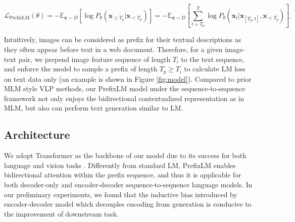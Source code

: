 \begin{equation}
\label{eq:prefix}
    \mathcal{L}_\text{PrefixLM}(\theta) = - \mathbb{E}_{\textbf{x} \sim D} \left[ \log P_{\theta}(\textbf{x}_{\geq T_p} | \textbf{x}_{<T_p}) \right] = - \mathbb{E}_{\textbf{x} \sim D} \left[ \sum_{t=T_p}^{T}  \log P_{\theta}(\textbf{x}_t|\textbf{x}_{[T_p, t]}, \textbf{x}_{<T_p}) \right].
\end{equation}

Intuitively, images can be considered as prefix for their textual descriptions as they often appear before text in a web document. Therefore, for a given image-text pair, we prepend image feature sequence of length $T_i$ to the text sequence, and enforce the model to sample a prefix of length $T_p \geq T_i$ to calculate LM loss on text data only (an example is shown in Figure \ref{fig:model}).
Compared to prior MLM style VLP methods, our PrefixLM model under the sequence-to-sequence framework not only enjoys the bidirectional contextualized representation as in MLM, but also can perform text generation similar to LM.

\subsection{Architecture}

We adopt Transformer as the backbone of our model due to its success for both language and vision tasks \citep{devlin2018bert,dosovitskiy2021an}. Differently from standard LM, PrefixLM enables bidirectional attention within the prefix sequence, and thus it is applicable for both decoder-only and encoder-decoder sequence-to-sequence language models. In our preliminary experiments, we found that the inductive bias introduced by encoder-decoder model which decouples encoding from generation is conducive to the improvement of downstream task.

